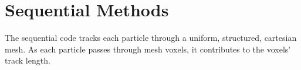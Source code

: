 \section{Sequential Methods}

The sequential code tracks each particle through a uniform, structured,
cartesian mesh. As each particle passes through mesh voxels, it contributes to
the voxels' track length. 
